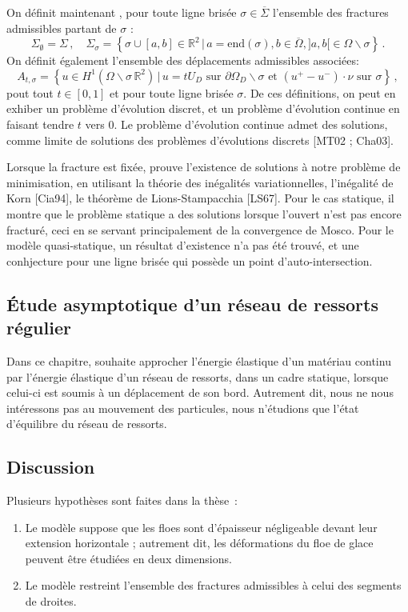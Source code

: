On définit maintenant \parencite[p.48]{balasoiu2020thesis}, pour toute ligne brisée $\sigma \in  \overline{\Sigma}$ l’ensemble des fractures admissibles partant de $\sigma$ :
$$
\Sigma_{\emptyset} = \Sigma \,, \quad \Sigma_{\sigma} = \left\{ \sigma \cup [a,b] \in \mathbb{R}^2 \, \lvert \, a = \text{end}(\sigma), b\in \overline{\Omega}, ]a,b[ \in \Omega\backslash \sigma \right\} \,.
$$
On définit également l'ensemble des déplacements admissibles associées:
$$
A_{t,\sigma} = \left\{  u \in H^1(\Omega \backslash \sigma \, \mathbb{R}^2) \, \rvert \, u=tU_D \text{ sur } \partial \Omega_D \backslash \sigma \text{ et } (u^+ - u^{-}) \cdot \nu \text{ sur } \sigma \right\} \,,
$$
pout tout $t \in [0,1]$ et pour toute ligne brisée $\sigma$. De ces définitions, on peut en exhiber un problème d'évolution discret, et un problème d'évolution continue en faisant tendre $t$ vers $0$. Le problème d’évolution continue admet des solutions, comme limite de solutions des problèmes d’évolutions discrets [MT02 ; Cha03].

Lorsque la fracture est fixée, \citeauthor{balasoiu2020thesis} prouve l’existence de solutions à notre problème de minimisation, en utilisant la théorie des inégalités variationnelles, l'inégalité de Korn [Cia94], le théorème de Lions-Stampacchia [LS67]. Pour le cas statique, il montre que le problème statique a des solutions lorsque l’ouvert n’est pas encore fracturé, ceci en se servant principalement de la convergence de Mosco. Pour le modèle quasi-statique, un résultat d'existence n'a pas été trouvé, et une conhjecture pour une ligne brisée qui possède un point d'auto-intersection.



\subsection{Étude asymptotique d’un réseau de ressorts régulier} 

Dans ce chapitre, \citeauthor{balasoiu2020halthesis} souhaite approcher l’énergie élastique d’un matériau continu par l’énergie élastique d’un réseau de ressorts, dans un cadre statique, lorsque celui-ci est soumis à un déplacement de son bord. Autrement dit, nous ne nous intéressons pas au mouvement des particules, nous n’étudions que l’état d’équilibre du réseau de ressorts.







\subsection{Discussion}

Plusieurs hypothèses sont faites dans la thèse :
\begin{enumerate}
    \item Le modèle suppose que les floes sont d’épaisseur négligeable devant leur extension horizontale ; autrement dit, les déformations du floe de glace peuvent être étudiées en deux dimensions.
    \item Le modèle restreint l’ensemble des fractures admissibles à celui des segments de droites.
\end{enumerate}